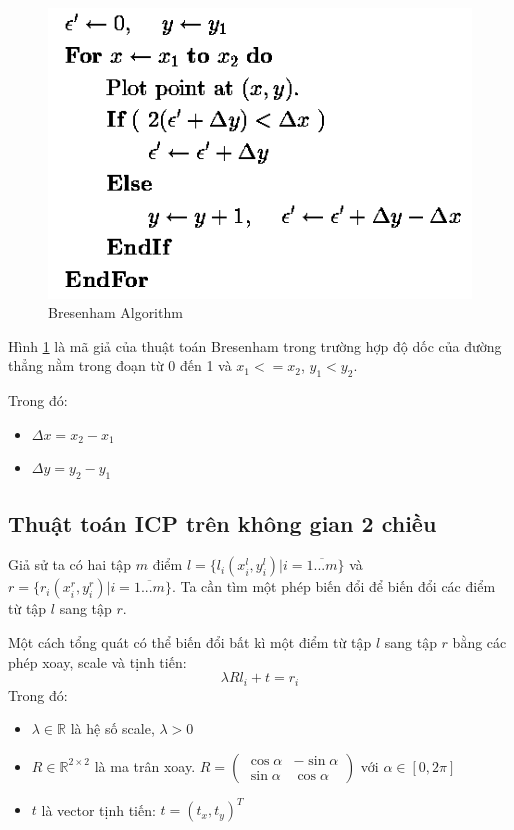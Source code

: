 \documentclass[../../main.tex]{subfiles}
\begin{document}
\begin{figure}[H]
    \begin{center}
        \includegraphics[scale=0.5]{pseudo2.png}
    \end{center}
    \caption{Bresenham Algorithm}
    \label{fig:bresenham_algorithm}
\end{figure}

Hình \ref{fig:bresenham_algorithm} là mã giả của thuật toán Bresenham trong trường hợp độ dốc của đường thẳng nằm trong đoạn từ 0 đến 1 và $x_1 <= x_2$, $y_1<y_2$.

Trong đó:
\begin{itemize}
    \item $\Delta x = x_2 - x_1$
    \item $\Delta y = y_2 - y_1$
\end{itemize}


\subsection*{Thuật toán ICP trên không gian 2 chiều}
Giả sử ta có hai tập $m$ điểm $l = \{l_i(x^l_i, y^l_i) | i = \overline{1...m} \}$ và $r = \{r_i(x^r_i, y^r_i) | i = \overline{1...m} \}$. Ta cần tìm một phép biến đổi để biến đổi các điểm từ tập $l$ sang tập $r$. 

Một cách tổng quát có thể biến đổi bất kì một điểm từ tập $l$ sang tập $r$ bằng các phép xoay, scale và tịnh tiến:
\begin{equation}
    \lambda R l_i + t = r_i
\end{equation}
Trong đó:
\begin{itemize}
    \item $\lambda \in \mathbb{R}$ là hệ số scale, $\lambda > 0$
    \item $R \in \mathbb{R}^{2 \times 2}$ là ma trân xoay. $R = \begin{pmatrix}
        \cos{\alpha} & -\sin{\alpha}\\
        \sin{\alpha} & \cos{\alpha}
    \end{pmatrix}$ với $\alpha \in \left[0, 2\pi\right] $
    \item $t$ là vector tịnh tiến: $t = (t_x, t_y)^T$
\end{itemize}
\end{document}
